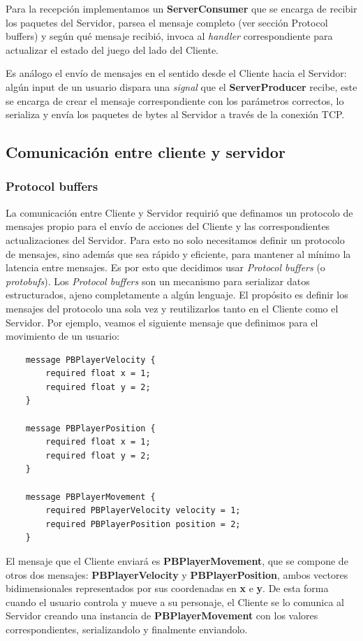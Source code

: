 Para la recepción implementamos un \textbf{ServerConsumer} que se encarga de recibir los paquetes 
del Servidor, parsea el mensaje completo (ver sección Protocol buffers) y según qué mensaje recibió, 
invoca al \textit{handler} correspondiente para actualizar el estado del juego del lado del Cliente.

Es análogo el envío de mensajes en el sentido desde el Cliente hacia el Servidor: algún input de un 
usuario dispara una \textit{signal} que el \textbf{ServerProducer} recibe, este se encarga de crear 
el mensaje correspondiente con los parámetros correctos, lo serializa y envía los paquetes de bytes 
al Servidor a través de la conexión TCP.

\subsection{Comunicación entre cliente y servidor}

\subsubsection{Protocol buffers}

\noindent La comunicación entre Cliente y Servidor requirió que definamos un protocolo de mensajes propio para 
el envío de acciones del Cliente y las correspondientes actualizaciones del Servidor.
Para esto no solo necesitamos definir un protocolo de mensajes, sino además que sea rápido y eficiente, 
para mantener al mínimo la latencia entre mensajes.
Es por esto que decidimos usar \textit{Protocol buffers} (o \textit{protobufs}). Los 
\textit{Protocol buffers} son un mecanismo para serializar datos estructurados, ajeno completamente 
a algún lenguaje. El propósito es definir los mensajes del protocolo una sola vez y reutilizarlos 
tanto en el Cliente como el Servidor.
Por ejemplo, veamos el siguiente mensaje que definimos para el movimiento de un usuario:
\begin{verbatim}
    message PBPlayerVelocity {
        required float x = 1;
        required float y = 2;
    }

    message PBPlayerPosition {
        required float x = 1;
        required float y = 2;
    }

    message PBPlayerMovement {
        required PBPlayerVelocity velocity = 1;
        required PBPlayerPosition position = 2;
    }
\end{verbatim}

El mensaje que el Cliente enviará es \textbf{PBPlayerMovement}, que se compone de otros dos mensajes: 
\textbf{PBPlayerVelocity} y \textbf{PBPlayerPosition}, ambos vectores bidimensionales representados 
por sus coordenadas en \textbf{x} e \textbf{y}. De esta forma cuando el usuario controla y mueve a 
su personaje, el Cliente se lo comunica al Servidor creando una instancia de \textbf{PBPlayerMovement} 
con los valores correspondientes, serializandolo y finalmente enviandolo.


